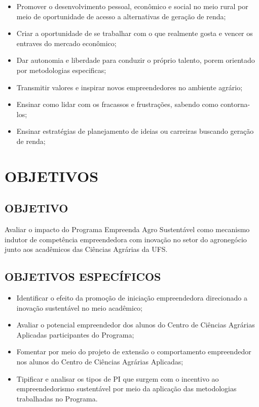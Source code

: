 \begin{itemize}
\item{Promover o desenvolvimento pessoal, econômico e social no meio rural por meio de oportunidade de acesso a alternativas de geração de renda;}
\item{Criar a oportunidade de se trabalhar com o que realmente gosta e vencer os entraves do mercado econômico;}
\item{Dar autonomia e liberdade para conduzir o próprio talento, porem orientado por metodologias especificas;}
\item{Transmitir valores e inspirar novos empreendedores no ambiente agrário;}
\item{Ensinar como lidar com os fracassos e frustrações, sabendo como contorna-los;}
\item{Ensinar estratégias de planejamento de ideias ou carreiras buscando geração de renda;}
\end{itemize}


\section{OBJETIVOS}

\subsection{OBJETIVO}

Avaliar o impacto do Programa Empreenda Agro Sustentável como mecanismo indutor de competência empreendedora com inovação no setor do agronegócio junto aos acadêmicos das Ciências Agrárias da UFS.



\subsection{OBJETIVOS ESPECÍFICOS}

\begin{itemize}
\item{Identificar o efeito da promoção de iniciação empreendedora direcionado a inovação sustentável no meio acadêmico;}
\item {Avaliar o potencial empreendedor dos alunos do Centro de Ciências Agrárias Aplicadas participantes do Programa;
}
\item {Fomentar por meio do projeto de extensão o comportamento empreendedor nos alunos do Centro de Ciências Agrárias Aplicadas;}

\item {Tipificar e analisar os tipos de PI que surgem com o incentivo ao empreendedorismo sustentável por meio da aplicação das metodologias trabalhadas no Programa.}

\end{itemize}


